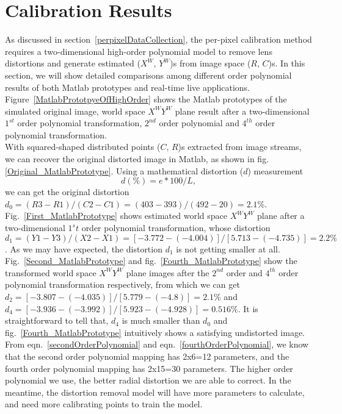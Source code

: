 \section{Calibration Results}
\label{sectionPrototypeTwoDtransformation} 
As discussed in section~\ref{perpixelDataCollection}, the per-pixel calibration method requires a two-dimensional high-order polynomial model to remove lens distortions and generate estimated (\(X^W,\, Y^W\))s from image space (\(R, \, C\))s. In this section, we will show detailed comparisons among different order polynomial results of both Matlab prototypes and real-time live applications. Figure~\ref{MatlabPrototpyeOfHighOrder} shows the Matlab prototypes of the simulated original image, world space \(X^WY^W\) plane result after a two-dimensional \(1^{st}\) order polynomial transformation, \(2^{nd}\) order polynomial and \(4^{th}\) order polynomial transformation. %
%
\\\indent
With squared-shaped distributed points (\(C,\, R\))s extracted from image streams, we can recover the original distorted image in Matlab, as shown in fig.\ref{Original_MatlabPrototype}. Using a mathematical distortion (\(d\)) measurement \cite{distortionMeasurement_2012}
%
\begin{equation}
d (\%)=  e*100/L ,
\label{mathematicalDistortion}
\end{equation}%
%
\noindent
we can get the original distortion \(d_0 = (R3 - R1) / (C2 -C1) = (403 - 393) / (492 - 20) = 2.1\%\). Fig.~\ref{First_MatlabPrototype} shows estimated world space \(X^WY^W\) plane after a two-dimensional \(1^st\) order polynomial transformation, whose distortion \(d_1 = (Y1 - Y3) / (X2 -X1) = [-3.772 - (-4.004)] / [5.713 - (-4.735)] = 2.2\%\). As we may have expected, the distortion \(d_1\) is not getting smaller at all. Fig.~\ref{Second_MatlabPrototype} and fig.~\ref{Fourth_MatlabPrototype} show the transformed world space \(X^WY^W\) plane images after the \(2^{nd}\) order and \(4^{th}\) order polynomial transformation respectively, from which we can get \(d_2 = [-3.807 - (-4.035)] / [5.779 - (-4.8)] = 2.1\%\) and \(d_4 = [-3.936 - (-3.992)] / [5.923 - (-4.928)] = 0.516\%\). It is straightforward to tell that, \(d_4\) is much smaller than \(d_0\) and fig.~\ref{Fourth_MatlabPrototype} intuitively shows a satisfying undistorted image. From eqn.~\ref{secondOrderPolynomial} and eqn.~\ref{fourthOrderPolynomial}, we know that the second order polynomial mapping has 2x6=12 parameters, and the fourth order polynomial mapping has 2x15=30 parameters. The higher order polynomial we use, the better radial distortion we are able to correct. In the meantime, the distortion removal model will have more parameters to calculate, and need more calibrating points to train the model.%
